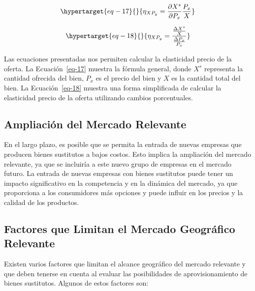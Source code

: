 \documentclass[
  a4paper,
]{article}
\begin{document}
\begin{equation}\protect\hypertarget{eq-17}{}{
\eta_{XP_{y}} = \frac{\partial X^s}{\partial P_{x}} \frac{P_{x}}{X}
}\label{eq-17}\end{equation}

\begin{equation}\protect\hypertarget{eq-18}{}{
\eta_{XP_{y}} = \frac{\frac{\Delta X^s}{X}}{\frac{\Delta P_{x}}{P_{x}}}
}\label{eq-18}\end{equation}

Las ecuaciones presentadas nos permiten calcular la elasticidad precio
de la oferta. La Ecuación~\ref{eq-17} muestra la fórmula general, donde
\(X^s\) representa la cantidad ofrecida del bien, \(P_x\) es el precio
del bien y \(X\) es la cantidad total del bien. La Ecuación~\ref{eq-18}
muestra una forma simplificada de calcular la elasticidad precio de la
oferta utilizando cambios porcentuales.

\hypertarget{ampliaciuxf3n-del-mercado-relevante}{%
\subsection{Ampliación del Mercado
Relevante}\label{ampliaciuxf3n-del-mercado-relevante}}

En el largo plazo, es posible que se permita la entrada de nuevas
empresas que producen bienes sustitutos a bajos costos. Esto implica la
ampliación del mercado relevante, ya que se incluiría a este nuevo grupo
de empresas en el mercado futuro. La entrada de nuevas empresas con
bienes sustitutos puede tener un impacto significativo en la competencia
y en la dinámica del mercado, ya que proporciona a los consumidores más
opciones y puede influir en los precios y la calidad de los productos.

\hypertarget{factores-que-limitan-el-mercado-geogruxe1fico-relevante}{%
\subsection{Factores que Limitan el Mercado Geográfico
Relevante}\label{factores-que-limitan-el-mercado-geogruxe1fico-relevante}}

Existen varios factores que limitan el alcance geográfico del mercado
relevante y que deben tenerse en cuenta al evaluar las posibilidades de
aprovisionamiento de bienes sustitutos. Algunos de estos factores son:
\end{document}
